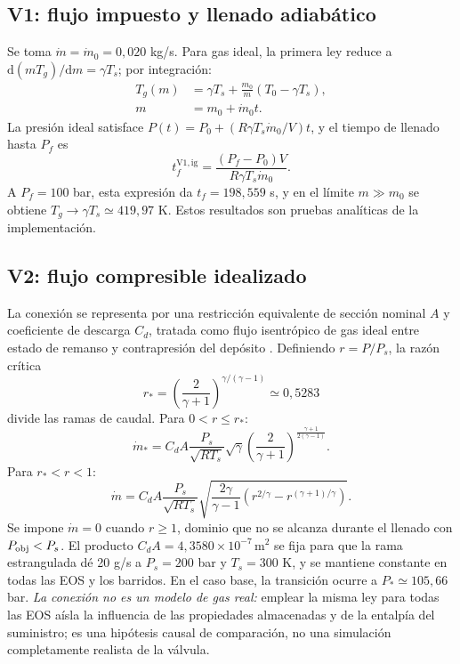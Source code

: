 \documentclass[11pt,letterpaper]{article}
\newcommand{\dd}{\mathrm{d}}
\begin{document}
\subsection{V1: flujo impuesto y llenado adiabático}
Se toma $\dot m=\dot m_0=0,020$ kg/s. Para gas ideal, la primera ley reduce a $\dd(mT_g)/\dd m=\gamma T_s$; por integración:
\begin{equation}
\boxed{\begin{aligned}T_g(m)&=\gamma T_s+\frac{m_0}{m}(T_0-\gamma T_s),\\m&=m_0+\dot m_0t.\end{aligned}}\label{eq:exacta}
\end{equation}
La presión ideal satisface $P(t)=P_0+(R\gamma T_s\dot m_0/V)t$, y el tiempo de llenado hasta $P_f$ es
\begin{equation}
t_f^{\mathrm{V1,ig}}=\frac{(P_f-P_0)V}{R\gamma T_s\dot m_0}.\label{eq:exactat}
\end{equation}
A $P_f=100$ bar, esta expresión da $t_f=198,559$ s, y en el límite $m\gg m_0$ se obtiene $T_g\to\gamma T_s\simeq 419,97$ K. Estos resultados son pruebas analíticas de la implementación.

\subsection{V2: flujo compresible idealizado}
La conexión se representa por una restricción equivalente de sección nominal $A$ y coeficiente de descarga $C_d$, tratada como flujo isentrópico de gas ideal entre estado de remanso y contrapresión del depósito \citep{NASA}. Definiendo $r=P/P_s$, la razón crítica
\begin{equation}
r_*=\left(\frac{2}{\gamma+1}\right)^{\gamma/(\gamma-1)}\simeq0,5283\label{eq:crit}
\end{equation}
divide las ramas de caudal. Para $0<r\le r_*$:
\begin{equation}
\dot m_*=C_dA\frac{P_s}{\sqrt{RT_s}}\sqrt\gamma\left(\frac{2}{\gamma+1}\right)^{\frac{\gamma+1}{2(\gamma-1)}}.\label{eq:choked}
\end{equation}
Para $r_*<r<1$:
\begin{equation}
\dot m=C_dA\frac{P_s}{\sqrt{RT_s}}\sqrt{\frac{2\gamma}{\gamma-1}\left(r^{2/\gamma}-r^{(\gamma+1)/\gamma}\right)}.\label{eq:sub}
\end{equation}
Se impone $\dot m=0$ cuando $r\ge1$, dominio que no se alcanza durante el llenado con $P_{\rm obj}<P_s$. El producto $C_dA=4,3580\times10^{-7}\,\mathrm{m^2}$ se fija para que la rama estrangulada dé 20 g/s a $P_s=200$ bar y $T_s=300$ K, y se mantiene constante en todas las EOS y los barridos. En el caso base, la transición ocurre a $P_*\simeq 105,66$ bar. \emph{La conexión no es un modelo de gas real:} emplear la misma ley para todas las EOS aísla la influencia de las propiedades almacenadas y de la entalpía del suministro; es una hipótesis causal de comparación, no una simulación completamente realista de la válvula.
\end{document}

